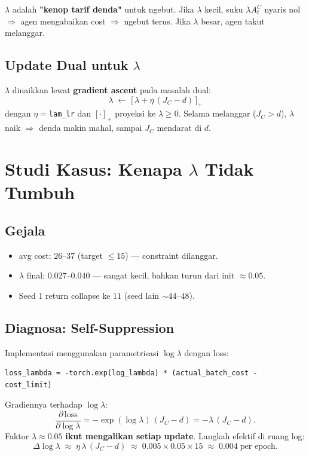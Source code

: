 \documentclass[11pt,a4paper]{article}
\begin{document}
\begin{intuisi}
$\lambda$ adalah \textbf{"kenop tarif denda"} untuk ngebut. Jika $\lambda$ kecil,
suku $\lambda A_t^{C}$ nyaris nol $\Rightarrow$ agen mengabaikan cost $\Rightarrow$ ngebut terus.
Jika $\lambda$ besar, agen takut melanggar.
\end{intuisi}

\subsection{Update Dual untuk $\lambda$}
$\lambda$ dinaikkan lewat \textbf{gradient ascent} pada masalah dual:
\[ \boxed{\; \lambda \;\leftarrow\; \big[\,\lambda + \eta\,(J_C - d)\,\big]_+ \;} \]
dengan $\eta=$\texttt{lam\_lr} dan $[\cdot]_+$ proyeksi ke $\lambda\ge 0$.
Selama melanggar ($J_C > d$), $\lambda$ naik $\Rightarrow$ denda makin mahal,
sampai $J_C$ mendarat di $d$.

\section{Studi Kasus: Kenapa $\lambda$ Tidak Tumbuh}
\subsection{Gejala}
\begin{itemize}[nosep]
  \item avg cost: $26$--$37$ (target $\le 15$) --- constraint dilanggar.
  \item $\lambda$ final: $0.027$--$0.040$ --- sangat kecil, bahkan turun dari init $\approx 0.05$.
  \item Seed 1 return collapse ke $11$ (seed lain $\sim 44$--$48$).
\end{itemize}

\subsection{Diagnosa: Self-Suppression}
Implementasi menggunakan parametrisasi $\log\lambda$ dengan loss:
\begin{lstlisting}
loss_lambda = -torch.exp(log_lambda) * (actual_batch_cost - cost_limit)
\end{lstlisting}
Gradiennya terhadap $\log\lambda$:
\[ \frac{\partial\,\text{loss}}{\partial \log\lambda} = -\exp(\log\lambda)\,(J_C - d) = -\lambda\,(J_C - d). \]
Faktor $\lambda \approx 0.05$ \textbf{ikut mengalikan setiap update}. Langkah efektif di ruang log:
\[ \Delta \log\lambda \;\approx\; \eta\,\lambda\,(J_C - d) \;\approx\; 0.005 \times 0.05 \times 15 \;\approx\; 0.004 \;\text{per epoch.} \]
\end{document}
